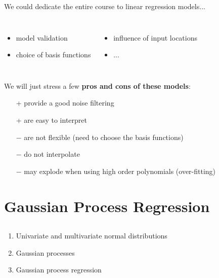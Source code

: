 \documentclass{beamer}
\begin{document}
\begin{frame}{}
We could dedicate the entire course to linear regression models...
\begin{columns}[c]
\column{5cm}
\begin{itemize}
	\item model validation
	\item choice of basis functions
\end{itemize}
\column{6cm}
\begin{itemize}
	\item influence of input locations
	\item ...
\end{itemize}
\end{columns}
\vspace{10mm}
We will just stress a few \textbf{pros and cons of these models}:
\begin{itemize}
  \item[+] provide a good noise filtering
  \item[+] are easy to interpret
  \item[] \vspace{-5mm}
  \item[$-$] are not flexible (need to choose the basis functions)
  \item[$-$] do not interpolate
  \item[$-$] may explode when using high order polynomials (over-fitting)
\end{itemize}
\end{frame}

\section[Gaussian Process regression]{Gaussian Process Regression}
\subsection{}
\begin{frame}{}
\vspace{0.75cm}
\vspace{0.5cm}
\begin{enumerate}
    \item Univariate and multivariate normal distributions
    \item Gaussian processes
    \item Gaussian process regression
\end{enumerate}
\end{frame}
\end{document}
